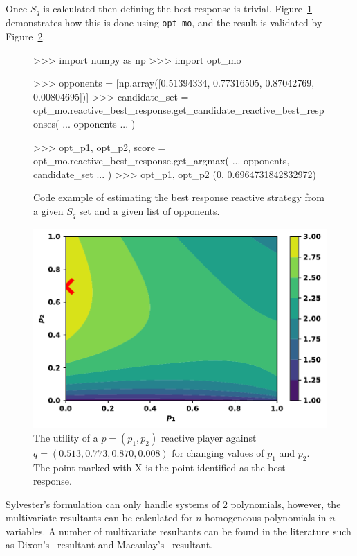 Once \(S_q\) is calculated then defining the best response is trivial.
Figure~\ref{fig:reactive_example_best_response} demonstrates how this is done
using \texttt{opt_mo}, and the result is validated by
Figure~\ref{fig:reactive_example_utility}.

\begin{figure}[!htbp]
    \begin{usagepy}
>>> import numpy as np
>>> import opt_mo

>>> opponents = [np.array([0.51394334, 0.77316505, 0.87042769, 0.00804695])]
>>> candidate_set = opt_mo.reactive_best_response.get_candidate_reactive_best_responses(
...     opponents
... )

>>> opt_p1, opt_p2, score = opt_mo.reactive_best_response.get_argmax(
...     opponents, candidate_set
... )
>>> opt_p1, opt_p2
(0, 0.6964731842832972)

\end{usagepy}
\caption{Code example of estimating the best response
reactive strategy from a given \(S_q\) set and a given list of
opponents.}\label{fig:reactive_example_best_response}
\end{figure}

\begin{figure}[!htbp]
    \centering
    \includegraphics[width=.6\linewidth]{src/chapters/05/reactive_best_response.pdf}
    \caption{The utility of a \(p=(p_1, p_2)\) reactive player against \(q =
    (0.513, 0.773, 0.870, 0.008)\) for changing values of \(p_1\) and \(p_2\).
    The point marked with X is the point identified as the best response.}
    \label{fig:reactive_example_utility}
\end{figure}

Sylvester's formulation can only handle systems of 2 polynomials, however, the
multivariate resultants can be calculated for \(n\) homogeneous polynomials in \(n\)
variables. A number of
multivariate resultants can be found in the literature such as
Dixon's~\cite{ResultantKapur} resultant and Macaulay's~\cite{Macaulay1902}
resultant.

